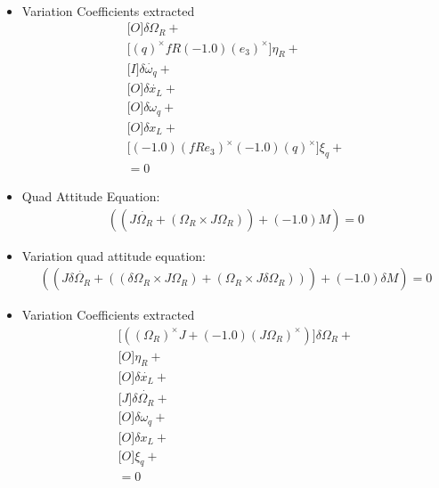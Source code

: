 \begin{itemize}
\begin{gather}
\end{gather}
\item Variation Coefficients extracted
\begin{gather}
\Big[O\Big]\delta \Omega_{R}+\\
\Big[{(q)}^\times f R (-1.0) {(e_3)}^\times\Big]\eta_{R}+\\
\Big[I\Big]\delta \dot{\omega_{q}}+\\
\Big[O\Big]\delta \dot{x_L}+\\
\Big[O\Big]\delta \omega_{q}+\\
\Big[O\Big]\delta x_L+\\
\Big[(-1.0) {(fR e_3)}^\times (-1.0) {(q)}^\times\Big]\xi_{q}+\\
=0
\end{gather}
\item Quad Attitude Equation: \begin{gather}
((J \dot{\Omega_{R}}+(\Omega_{R}\times J \Omega_{R}))+(-1.0)M)=0
\end{gather}
\item Variation quad attitude equation: \begin{gather}
((J \delta \dot{\Omega_{R}}+((\delta \Omega_{R}\times J \Omega_{R})+(\Omega_{R}\times J \delta \Omega_{R})))+(-1.0)\delta M)=0
\end{gather}
\item Variation Coefficients extracted
\begin{gather}
\Big[({(\Omega_{R})}^\times J+(-1.0) {(J \Omega_{R})}^\times)\Big]\delta \Omega_{R}+\\
\Big[O\Big]\eta_{R}+\\
\Big[O\Big]\delta \dot{x_L}+\\
\Big[J\Big]\delta \dot{\Omega_{R}}+\\
\Big[O\Big]\delta \omega_{q}+\\
\Big[O\Big]\delta x_L+\\
\Big[O\Big]\xi_{q}+\\
=0
\end{gather}
\end{itemize}